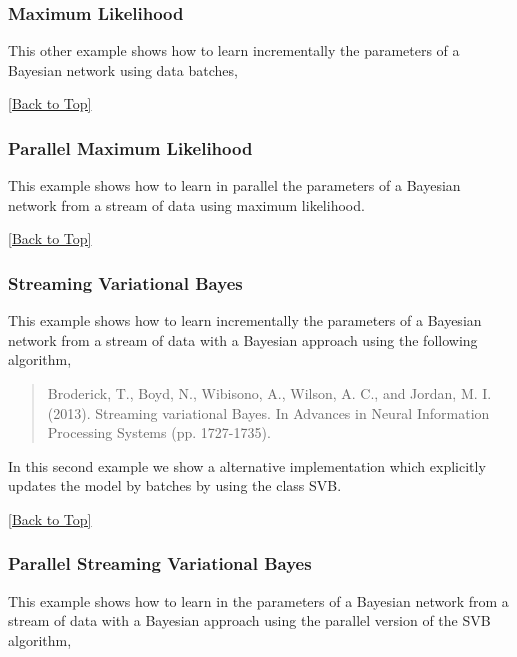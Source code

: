 \documentclass[10pt,a4paper]{article}
\begin{document}
\subsubsection{Maximum Likelihood}\label{sec:bns:learning:batchml}
This other example shows how to learn incrementally the parameters of a Bayesian network using data batches,

\hyperref[sec:bns]{[Back to Top]}\newline 


\subsubsection{Parallel Maximum Likelihood}\label{sec:bns:learning:parallelml}
This example shows how to learn in parallel the parameters of a Bayesian network from a stream of data using maximum likelihood.

\hyperref[sec:bns]{[Back to Top]}\newline 


\subsubsection{Streaming Variational Bayes}\label{sec:bns:learning:svb}
This example shows how to learn incrementally the parameters of a Bayesian network from a stream of data with a Bayesian approach using the following algorithm,

\begin{quotation}
Broderick, T., Boyd, N., Wibisono, A., Wilson, A. C., and Jordan, M. I. (2013). Streaming variational Bayes. In Advances in Neural Information Processing Systems (pp. 1727-1735).
\end{quotation}

In this second example we show a alternative implementation which explicitly updates the model by batches by using the class SVB.

\hyperref[sec:bns]{[Back to Top]}\newline 




\subsubsection{Parallel Streaming Variational Bayes}\label{sec:bns:learning:parallelsvb}
This example shows how to learn in the parameters of a Bayesian network from a stream of data with a Bayesian approach using the parallel version of the SVB algorithm,
\end{document}
